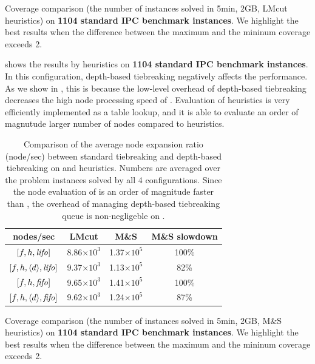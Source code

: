 \begin{table}[htbp]
 {
 \centering
 \setlength{\tabcolsep}{0.1em}
 
 \caption{
 Coverage comparison (the number of instances solved in 5min, 2GB, LMcut
 heuristics) on \textbf{1104 standard IPC benchmark instances}. We highlight the
 best results when the difference between the maximum and the mininum coverage exceeds 2.
 }
 \label{tbl:lmcut-ipc-full}
 }
\end{table}


 shows the results by \mands heuristics on \textbf{1104 standard
IPC benchmark instances}.
In this configuration, depth-based tiebreaking negatively affects the performance.
As we show in , this is because
the low-level overhead of depth-based tiebreaking decreases the high
node processing speed of \mands. Evaluation of \mands heuristics is
very efficiently implemented as a table lookup, and it is able to
evaluate an order of magnutude larger number of nodes
compared to \lmcut heuristics.


\begin{table}[htb]
 \centering
 \begin{tabular}{cccc}
  nodes/sec                  & LMcut      & M\&S       & M\&S slowdown\\
  \hline
  $[f,h,{\text{\textit{lifo}}}]$              & 8.86$\times 10^3$ & 1.37$\times 10^5$ & 100\%\\
  $[f,h,{\left<d\right>},{\text{\textit{lifo}}}]$ & 9.37$\times 10^3$ & 1.13$\times 10^5$ & 82\%\\
  \hline
  $[f,h,{\text{\textit{fifo}}}]$              & 9.65$\times 10^3$ & 1.41$\times 10^5$ & 100\%\\
  $[f,h,{\left<d\right>},{\text{\textit{fifo}}}]$ & 9.62$\times 10^3$ & 1.24$\times 10^5$ & 87\%\\
  \hline
 \end{tabular}
 \caption{Comparison of the average node expansion ratio (node/sec) between
 standard tiebreaking and depth-based tiebreaking on \lmcut and \mands
 heuristics. Numbers are averaged over the problem instances solved by
 all 4 configurations. Since the node evaluation of \mands is an order of
 magnitude faster than \lmcut, the overhead of managing depth-based
 tiebreaking queue is non-negligeble on \mands.}
 \label{tbl:expansion-ratio}
\end{table}

\begin{table}[htbp]
 {
 \centering
 \setlength{\tabcolsep}{0.1em}
 
 \caption{
 Coverage comparison (the number of instances solved in 5min, 2GB, M\&S
 heuristics) on \textbf{1104 standard IPC benchmark instances}. We highlight the
 best results when the difference between the maximum and the mininum coverage exceeds 2.
 }
 \label{tbl:mands-ipc-full}
 }
\end{table}

